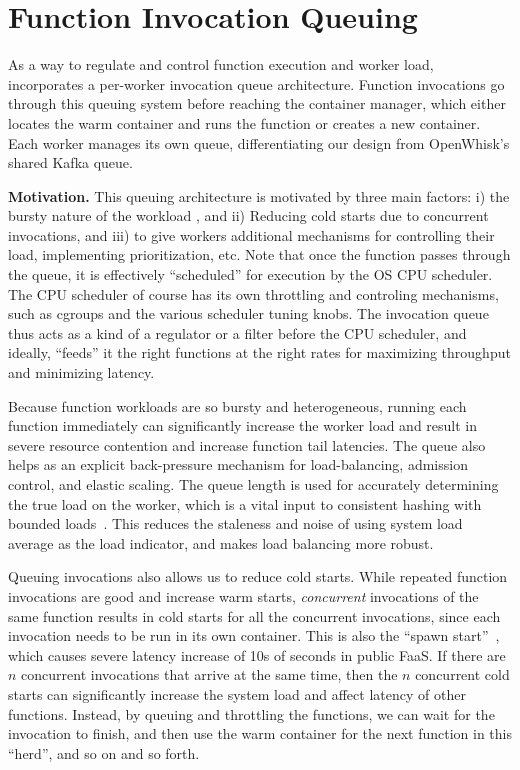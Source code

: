 \section{Function Invocation Queuing}
\label{sec:q}

As a way to regulate and control function execution and worker load, \sysname~ incorporates a per-worker invocation queue architecture. 
Function invocations go through this queuing system before reaching the container manager, which either locates the warm container and runs the function or creates a new container.
Each worker manages its own queue, differentiating our design from OpenWhisk's shared Kafka queue. 

\noindent \textbf{Motivation.}
%
This queuing architecture is motivated by three main factors: i) the bursty nature of the workload , and ii) Reducing cold starts due to concurrent invocations, and iii) to give workers additional mechanisms for controlling their load, implementing prioritization, etc. 
Note that once the function passes through the queue, it is effectively ``scheduled'' for execution by the OS CPU scheduler.
The CPU scheduler of course has its own throttling and controling mechanisms, such as cgroups and the various scheduler tuning knobs.
The invocation queue thus acts as a kind of a regulator or a filter before the CPU scheduler, and ideally, ``feeds'' it the right functions at the right rates for maximizing throughput and minimizing latency.
%

Because function workloads are so bursty and heterogeneous, running each function immediately can significantly increase the worker load and result in severe resource contention and increase  function tail latencies.
%
The queue also helps as an explicit back-pressure mechanism for load-balancing, admission control, and elastic scaling.
The queue length is  used for accurately determining the true load on the worker, which is a vital input to consistent hashing with bounded loads~\cite{faaslb-hpdc22}.
This reduces the staleness and noise of using system load average as the load indicator, and makes load balancing more robust.


Queuing invocations also allows us to reduce cold starts.
While repeated function invocations are good and increase warm starts, 
\emph{concurrent} invocations of the same function results in cold starts for all the concurrent invocations, since each invocation needs to be run in its own container.
This is also the ``spawn start''~\cite{ristov_colder_warmer}, which causes severe latency increase of 10s of  seconds in public FaaS. 
If there are $n$ concurrent invocations that arrive at the same time, then the $n$ concurrent cold starts can significantly increase the system load and affect latency of other functions.
Instead, by queuing and throttling the functions, we can wait for the invocation to finish, and then use the warm container for the next function in this ``herd'', and so on and so forth. %

